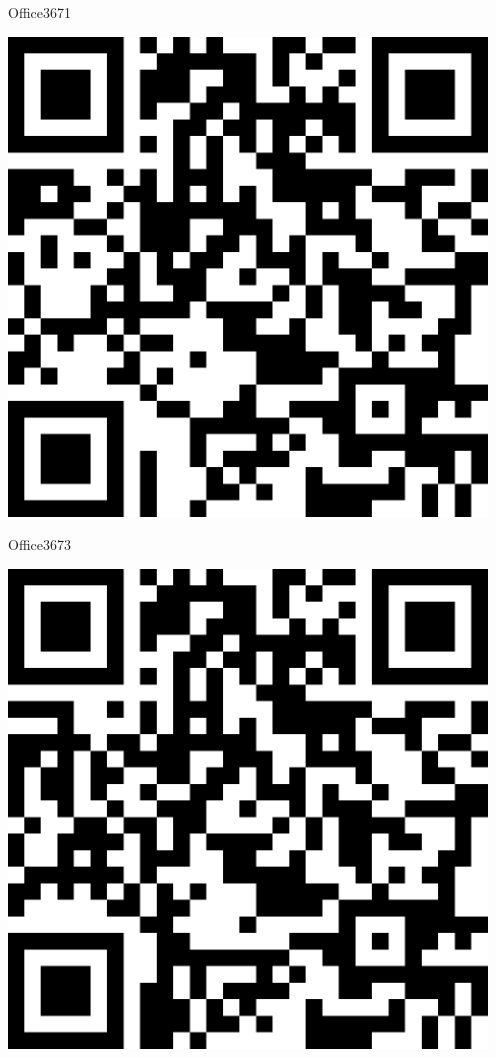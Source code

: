 \documentclass[letterpaper]{article}
\begin{document}
 \hfill{\small Office3671} 

 \vspace{1in} 
 \pagebreak 
{} 
 \vspace*{\fill} 
 \begingroup 
 \centerline{\includegraphics[scale=1,width=5in,height=5in]{Office3673.png}} 
 \endgroup 
 \vspace*{\fill} 

 \hfill{\small Office3673} 

 \vspace{1in} 
 \pagebreak 
{} 
 \vspace*{\fill} 
 \begingroup 
 \centerline{\includegraphics[scale=1,width=5in,height=5in]{Office3675.png}} 
 \endgroup 
 \vspace*{\fill} 
\end{document}
